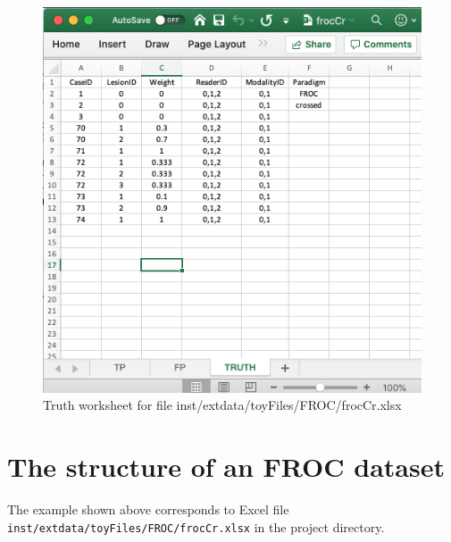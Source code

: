 \documentclass[
]{book}
\begin{document}
\begin{figure}

{\centering \includegraphics[width=0.5\linewidth,height=0.2\textheight]{images/frocCrTruth} 

}

\caption{Truth worksheet for file inst/extdata/toyFiles/FROC/frocCr.xlsx}\label{fig:frocCrTruth}
\end{figure}

\hypertarget{the-structure-of-an-froc-dataset}{%
\section{The structure of an FROC dataset}\label{the-structure-of-an-froc-dataset}}

The example shown above corresponds to Excel file \texttt{inst/extdata/toyFiles/FROC/frocCr.xlsx} in the project directory.
\end{document}
